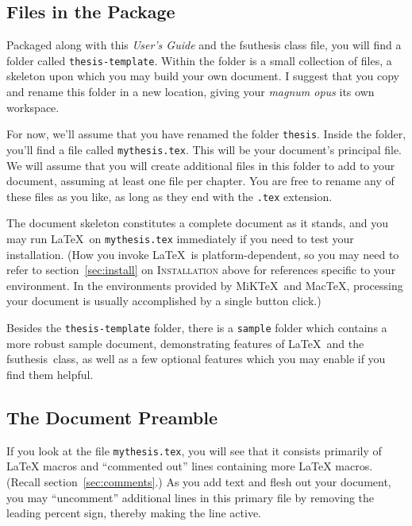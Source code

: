 \documentclass[11pt,letterpaper]{ltxdockit}[2011/03/25]
\newcommand*{\booktitle}[1]{\textit{#1}}
\newcommand*{\complit}[1]{\texttt{#1}}
\newcommand*{\pkg}[1]{\textsf{#1}}
\newcommand*{\fsuth}{\pkg{fsuthesis}}
\renewcommand{\-}{\discretionary{}{}{}}
\def\MiKTeX{MiK\TeX}
\def\MacTeX{\textsf{Mac}\TeX}
\begin{document}
\subsection{Files in the Package}

Packaged along with this \booktitle{User's Guide} and the \fsuth{}
class file, you will find a folder called
\complit{thesis-template}\index{fsuthesis@\pkg{fsuthesis}!package!contents}.
Within the folder is a small collection of files, a skeleton upon
which you may build your own document.  I suggest that you copy and
rename this folder in a new location, giving your \emph{magnum opus}
its own workspace.

For now, we'll assume that you have renamed the folder
\complit{thesis}.  Inside the folder, you'll find a file called
\complit{mythesis.tex}.  This will be your document's principal file.
We will assume that you will create additional files in this folder to
add to your document, assuming at least one file per chapter.  You are
free to rename any of these files as you like, as long as they end
with the \complit{.tex} extension.

The document skeleton constitutes a complete document as it stands,
and you may run \LaTeX\ on \complit{mythesis.tex} immediately if you
need to test your installation.  (How you invoke \LaTeX\ is
platform-dependent, so you may need to refer to
section~\ref{sec:install} on \textsc{Installation} above for
references specific to your environment.  In the environments provided
by \MiKTeX\ and \MacTeX, processing your document is usually
accomplished by a single button click.)

Besides the \complit{thesis-template} folder, there is a
\complit{sample} folder which contains a more robust sample document,
demonstrating features of \LaTeX\ and the \fsuth\ class, as well as a
few optional features which you may enable if you find them helpful.

\subsection{The Document Preamble}

If you look at the file \complit{mythesis.tex}, you will see that it
consists primarily of \LaTeX{} macros and ``commented out'' lines
containing more \LaTeX{} macros.  (Recall section~\ref{sec:comments}.)
As you add text and flesh out your document, you may ``uncomment''
additional lines in this primary file by removing the leading percent
sign, thereby making the line active.
\end{document}
